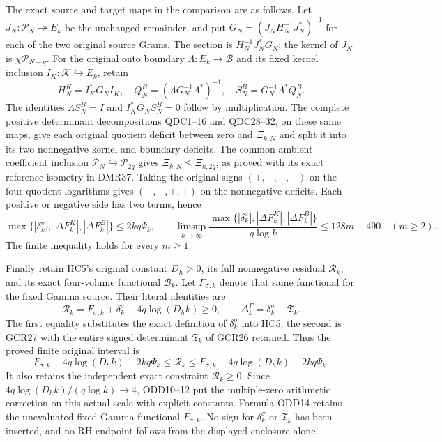 The exact source and target maps in the comparison are as follows.
Let $J_N:\mathcal P_N\twoheadrightarrow E_k$ be the unchanged
remainder, and put $G_N=(J_NH_N^{-1}J_N^*)^{-1}$ for each
of the two original source Grams. The section is
$H_N^{-1}J_N^*G_N$; the kernel of $J_N$ is
$\chi\mathcal P_{N-q}$. For the original onto boundary
$\Lambda:E_k\to\mathcal B$ and its fixed kernel inclusion
$I_K:\mathcal K\hookrightarrow E_k$, retain
\[
 H_N^K=I_K^*G_NI_K,\quad
 Q_N^B=(\Lambda G_N^{-1}\Lambda^*)^{-1},\quad
 S_N^B=G_N^{-1}\Lambda^*Q_N^B .
 \tag{ODD11}
\]
The identities $\Lambda S_N^B=I$ and $I_K^*G_NS_N^B=0$
follow by multiplication. The complete positive determinant
decompositions QDC1--16 and QDC28--32, on these same maps,
give each original quotient deficit between zero and
$\Xi_{k,N}$ and split it into its two nonnegative kernel
and boundary deficits. The common ambient coefficient inclusion
$\mathcal P_N\hookrightarrow\mathcal P_{2q}$ gives
$\Xi_{k,N}\leq\Xi_{k,2q}$, as proved with its exact reference
isometry in DMR37. Taking the original signs $(+,+,-,-)$
on the four quotient logarithms gives $(-,-,+,+)$ on the
nonnegative deficits. Each positive or negative side has two
terms, hence
\[
 \max\{|\delta_k^\sigma|,|\Delta F_k^K|,|\Delta F_k^B|\}
 \leq2kq\Psi_k,
 \qquad
 \limsup_{k\to\infty}
 \frac{\max\{|\delta_k^\sigma|,|\Delta F_k^K|,|\Delta F_k^B|\}}
      {q\log k}\leq128m+490\quad(m\geq2).
 \tag{ODD12}
\]
The finite inequality holds for every $m\geq1$.

Finally retain HC5's original constant $D_h>0$, its full
nonnegative residual $\mathcal R_k$, and its exact four-volume
functional $\mathcal B_k$. Let $F_{\sigma,k}$ denote that same
functional for the fixed Gamma source. Their literal identities are
\[
 \mathcal R_k=F_{\sigma,k}+\delta_k^\sigma
                        -4q\log(D_hk)\geq0,
 \qquad
 \Delta_k^\Gamma=\delta_k^\sigma-\mathfrak T_k.
 \tag{ODD13}
\]
The first equality substitutes the exact definition of
$\delta_k^\sigma$ into HC5; the second is GCR27 with the
entire signed determinant $\mathfrak T_k$ of GCR26 retained.
Thus the proved finite original interval is
\[
 F_{\sigma,k}-4q\log(D_hk)-2kq\Psi_k
 \leq\mathcal R_k\leq
 F_{\sigma,k}-4q\log(D_hk)+2kq\Psi_k .
 \tag{ODD14}
\]
It also retains the independent exact constraint $\mathcal R_k\geq0$.
Since $4q\log(D_hk)/(q\log k)\to4$, ODD10--12 put the
multiple-zero arithmetic correction on this actual scale with
explicit constants. Formula ODD14 retains the unevaluated
fixed-Gamma functional $F_{\sigma,k}$. No sign for $\delta_k^\sigma$ or
$\mathfrak T_k$ has been inserted, and no RH endpoint follows
from the displayed enclosure alone.
